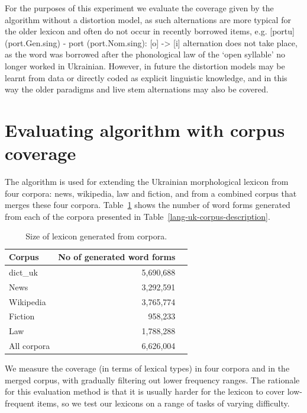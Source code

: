 \documentclass[11pt,a4paper]{article}
\begin{document}
For the purposes of this experiment we evaluate the coverage given by the algorithm without a distortion model, as such alternations are more typical for the older lexicon and often do not occur in recently borrowed items, e.g. [portu] (port.Gen.sing) - port (port.Nom.sing): [o] -> [i] alternation does not take place, as the word was borrowed after the phonological law of the `open syllable' no longer worked in Ukrainian. However, in future the distortion models may be learnt from data or directly coded as explicit linguistic knowledge, and in this way the older paradigms and live stem alternations may also be covered.



\section{Evaluating algorithm with corpus coverage}
\label{sec:Evaluation}

The algorithm is used for extending the Ukrainian morphological lexicon from four corpora: news, wikipedia, law and fiction, and from a combined corpus that merges these four corpora. Table~\ref{lang-uk-corpus-generation} shows the number of word forms generated from each of the corpora presented in Table~\ref{lang-uk-corpus-description}.

\begin{table}[]
	\begin{center}
		\begin{tabular}{|l|rr|}
			\hline \textbf{Corpus} & \textbf{No of generated word forms} & \textbf{ } 
			\\ \hline
			dict\_uk & 5,690,688  &  \\
			\hline
			News & 3,292,591 &  \\
			Wikipedia & 3,765,774 &  \\
			Fiction & 958,233 &  \\
			Law & 1,788,288 &  \\
			\hline
			All corpora & 6,626,004 &  \\
			\hline
		\end{tabular}
	\end{center}
	\caption{\label{lang-uk-corpus-generation} Size of lexicon generated from corpora. }
\end{table}

We measure the coverage (in terms of lexical types) in four corpora and in the merged corpus, with gradually filtering out lower frequency ranges. The rationale for this evaluation method is that it is usually harder for the lexicon to cover low-frequent items, so we test our lexicons on a range of tasks of varying difficulty.
\end{document}
